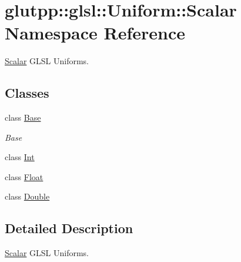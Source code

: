 \hypertarget{namespaceglutpp_1_1glsl_1_1Uniform_1_1Scalar}{\section{glutpp\-:\-:glsl\-:\-:\-Uniform\-:\-:\-Scalar \-Namespace \-Reference}
\label{namespaceglutpp_1_1glsl_1_1Uniform_1_1Scalar}
}


\hyperlink{namespaceglutpp_1_1glsl_1_1Uniform_1_1Scalar}{\-Scalar} \-G\-L\-S\-L \-Uniforms.  


\subsection*{\-Classes}
\begin{DoxyCompactItemize}
\item 
class \hyperlink{classglutpp_1_1glsl_1_1Uniform_1_1Scalar_1_1Base}{\-Base}
\begin{DoxyCompactList}\small\item\em \-Base \end{DoxyCompactList}\item 
class \hyperlink{classglutpp_1_1glsl_1_1Uniform_1_1Scalar_1_1Int}{\-Int}
\item 
class \hyperlink{classglutpp_1_1glsl_1_1Uniform_1_1Scalar_1_1Float}{\-Float}
\item 
class \hyperlink{classglutpp_1_1glsl_1_1Uniform_1_1Scalar_1_1Double}{\-Double}
\end{DoxyCompactItemize}


\subsection{\-Detailed \-Description}
\hyperlink{namespaceglutpp_1_1glsl_1_1Uniform_1_1Scalar}{\-Scalar} \-G\-L\-S\-L \-Uniforms. 